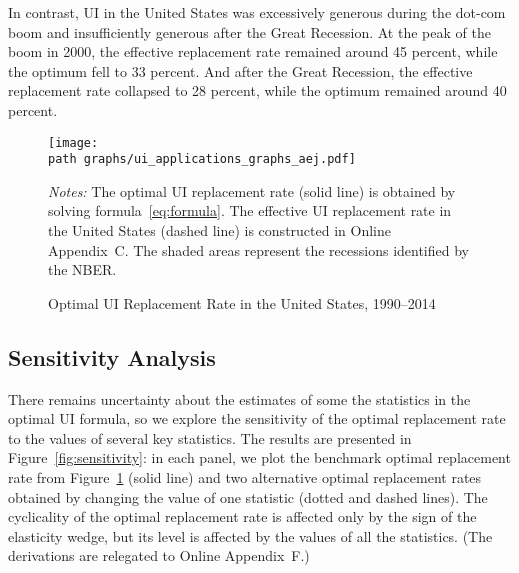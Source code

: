 \documentclass[letterpaper,12pt,leqno]{article}
\def\path{../}
\newcommand{\fignotes}[1]{\centering\parbox[c]{\textwidth}{\footnotesize \textit{Notes:} #1}}
\begin{document}
In contrast, UI in the United States was excessively generous during the dot-com boom and insufficiently generous after the Great Recession. At the peak of the boom in 2000, the effective replacement rate remained around 45 percent, while the optimum fell to 33 percent. And after the Great Recession, the effective replacement rate collapsed to 28 percent, while the optimum remained around 40 percent.

\begin{figure}[t] \centering
\texttt{[image: \\path graphs/ui\_applications\_graphs\_aej.pdf]}
\caption{Optimal UI Replacement Rate in the United States, 1990--2014}
\fignotes{The optimal UI replacement rate (solid line) is obtained by solving formula~\eqref{eq:formula}. The effective UI replacement rate in the United States (dashed line) is constructed in Online Appendix~C. The shaded areas represent the recessions identified by the NBER.}
\label{fig:optimal}\end{figure}


\subsection{Sensitivity Analysis}

There remains uncertainty about the estimates of some the statistics in the optimal UI formula, so we explore the sensitivity of the optimal replacement rate to the values of several key statistics. The results are presented in Figure~\ref{fig:sensitivity}: in each panel, we plot the benchmark optimal replacement rate from Figure~\ref{fig:optimal} (solid line) and two alternative optimal replacement rates obtained by changing the value of one statistic (dotted and dashed lines). The cyclicality of the optimal replacement rate is affected only by the sign of the elasticity wedge, but its level is affected by the values of all the statistics. (The derivations are relegated to Online Appendix~F.)
\end{document}
